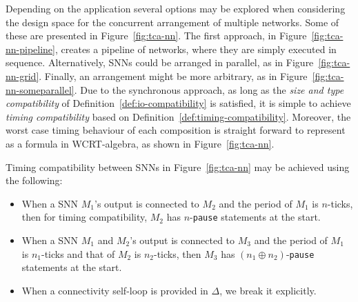 Depending on the application several options may be explored when
considering the design space for the concurrent arrangement of
multiple networks. Some of these are presented in Figure~\ref{fig:tca-nn}.
The first approach, in Figure~\ref{fig:tca-nn-pipeline}, creates a pipeline of networks, where they are simply executed in sequence.
Alternatively, \acp{SNN} could be arranged in parallel, as in Figure~\ref{fig:tca-nn-grid}. 
Finally, an arrangement might be more arbitrary, as in Figure~\ref{fig:tca-nn-someparallel}. 
Due to the synchronous approach, as long as the \emph{size and type
	compatibility} of Definition~\ref{def:io-compatibility} is
satisfied, it is simple to achieve \emph{timing compatibility} based on Definition~\ref{def:timing-compatibility}. 
Moreover, the worst case timing behaviour of each composition is
straight forward to represent as a formula in \ac{WCRT}-algebra, as
shown in Figure~\ref{fig:tca-nn}.

\begin{definition}
	\label{def:timing-compatibility}
	Timing compatibility between \acp{SNN} in Figure~\ref{fig:tca-nn} may
	be achieved using the following:
	\begin{itemize}
		\item When a \ac{SNN} $M_1$'s output is connected to $M_2$ and the
		period of $M_1$ is $n$-ticks, then for timing compatibility, $M_2$
		has $n$-\texttt{pause} statements at the start.
		\item When a \ac{SNN} $M_1$ and $M_2$'s output is connected to $M_3$ and the
		period of $M_1$ is $n_1$-ticks and that of $M_2$ is $n_2$-ticks,
		then $M_3$ has $(n_1 \oplus n_2)$-\texttt{pause} statements at the start.
		\item When a connectivity self-loop is provided in $\Delta$, we break it explicitly.
	\end{itemize}
\end{definition}



